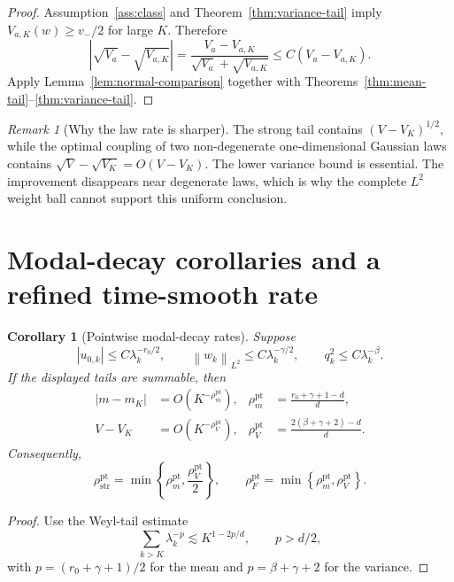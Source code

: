 \documentclass[11pt]{article}
\newtheorem{corollary}[assumption]{Corollary}
\theoremstyle{remark}
\newtheorem{remark}[assumption]{Remark}
\newcommand{\norm}[1]{\left\lVert #1\right\rVert}
\begin{document}
\begin{proof}
Assumption~\ref{ass:class} and Theorem~\ref{thm:variance-tail} imply $V_{a,K}(w)\ge v_-/2$ for large $K$. Therefore
\[
 |\sqrt{V_a}-\sqrt{V_{a,K}}|
 =\frac{V_a-V_{a,K}}{\sqrt{V_a}+\sqrt{V_{a,K}}}
 \le C(V_a-V_{a,K}).
\]
Apply Lemma~\ref{lem:normal-comparison} together with Theorems~\ref{thm:mean-tail}--\ref{thm:variance-tail}.
\end{proof}

\begin{remark}[Why the law rate is sharper]
The strong tail contains $(V-V_K)^{1/2}$, while the optimal coupling of two non-degenerate one-dimensional Gaussian laws contains $\sqrt V-\sqrt{V_K}=O(V-V_K)$. The lower variance bound is essential. The improvement disappears near degenerate laws, which is why the complete $L^2$ weight ball cannot support this uniform conclusion.
\end{remark}

\section{Modal-decay corollaries and a refined time-smooth rate}

\begin{corollary}[Pointwise modal-decay rates]\label{cor:pointwise}
Suppose
\[
 |u_{0,k}|\le C\lambda_k^{-r_0/2},
 \qquad
 \norm{w_k}_{L^2}\le C\lambda_k^{-\gamma/2},
 \qquad
 q_k^2\le C\lambda_k^{-\beta}.
\]
If the displayed tails are summable, then
\begin{align}
 |m-m_K|&=O(K^{-\rho_m^{\mathrm{pt}}}),
 &\rho_m^{\mathrm{pt}}
 &=\frac{r_0+\gamma+1-d}{d},
 \label{eq:ptmean}\\
 V-V_K&=O(K^{-\rho_V^{\mathrm{pt}}}),
 &\rho_V^{\mathrm{pt}}
 &=\frac{2(\beta+\gamma+2)-d}{d}.
 \label{eq:ptvar}
\end{align}
Consequently,
\begin{equation}\label{eq:ptrates}
 \rho_{\mathrm{str}}^{\mathrm{pt}}
 =\min\left\{\rho_m^{\mathrm{pt}},\frac{\rho_V^{\mathrm{pt}}}{2}\right\},
 \qquad
 \rho_F^{\mathrm{pt}}
 =\min\left\{\rho_m^{\mathrm{pt}},\rho_V^{\mathrm{pt}}\right\}.
\end{equation}
\end{corollary}

\begin{proof}
Use the Weyl-tail estimate
\[
 \sum_{k>K}\lambda_k^{-p}
 \lesssim K^{1-2p/d},
 \qquad p>d/2,
\]
with $p=(r_0+\gamma+1)/2$ for the mean and $p=\beta+\gamma+2$ for the variance.
\end{proof}
\end{document}
